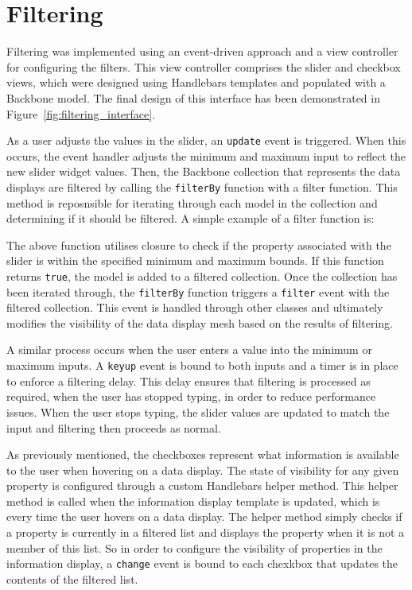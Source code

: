 \section{Filtering} {
\label{sec:filtering_implementation}

	Filtering was implemented using an event-driven approach and a view controller for configuring the filters. This view controller comprises the slider and checkbox views, which were designed using Handlebars templates and populated with a Backbone model. The final design of this interface has been demonstrated in Figure~\ref{fig:filtering_interface}.

	

	As a user adjusts the values in the slider, an \texttt{update} event is triggered. When this occurs, the event handler adjusts the minimum and maximum input to reflect the new slider widget values. Then, the Backbone collection that represents the data displays are filtered by calling the \texttt{filterBy} function with a filter function. This method is reposnsible for iterating through each model in the collection and determining if it should be filtered. A simple example of a filter function is:

	

	The above function utilises closure to check if the property associated with the slider is within the specified minimum and maximum bounds. If this function returns \texttt{true}, the model is added to a filtered collection. Once the collection has been iterated through, the \texttt{filterBy} function triggers a \texttt{filter} event with the filtered collection. This event is handled through other classes and ultimately modifies the visibility of the data display mesh based on the results of filtering.

	A similar process occurs when the user enters a value into the minimum or maximum inputs. A \texttt{keyup} event is bound to both inputs and a timer is in place to enforce a filtering delay. This delay ensures that filtering is processed as required, when the user has stopped typing, in order to reduce performance issues. When the user stops typing, the slider values are updated to match the input and filtering then proceeds as normal.

	As previously mentioned, the checkboxes represent what information is available to the user when hovering on a data display. The state of visibility for any given property is configured through a custom Handlebars helper method. This helper method is called when the information display template is updated, which is every time the user hovers on a data display. The helper method simply checks if a property is currently in a filtered list and displays the property when it is not a member of this list. So in order to configure the visibility of properties in the information display, a \texttt{change} event is bound to each chexkbox that updates the contents of the filtered list.

}
